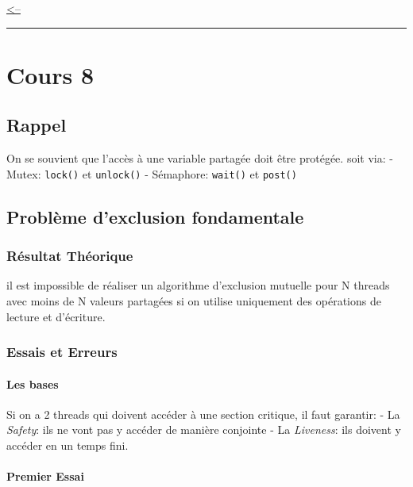 \href{../README.md}{\textless--}

\begin{center}\rule{0.5\linewidth}{0.5pt}\end{center}

\section{Cours 8}\label{cours-8}

\subsection{Rappel}\label{rappel}

On se souvient que l'accès à une variable partagée doit être protégée.
soit via: - Mutex: \texttt{lock()} et \texttt{unlock()} - Sémaphore:
\texttt{wait()} et \texttt{post()}

\subsection{Problème d'exclusion
fondamentale}\label{probluxe8me-dexclusion-fondamentale}

\subsubsection{Résultat Théorique}\label{ruxe9sultat-thuxe9orique}

il est impossible de réaliser un algorithme d'exclusion mutuelle pour N
threads avec moins de N valeurs partagées si on utilise uniquement des
opérations de lecture et d'écriture.

\subsubsection{Essais et Erreurs}\label{essais-et-erreurs}

\paragraph{Les bases}\label{les-bases}

Si on a 2 threads qui doivent accéder à une section critique, il faut
garantir: - La \emph{Safety}: ils ne vont pas y accéder de manière
conjointe - La \emph{Liveness}: ils doivent y accéder en un temps fini.

\paragraph{Premier Essai}\label{premier-essai}

